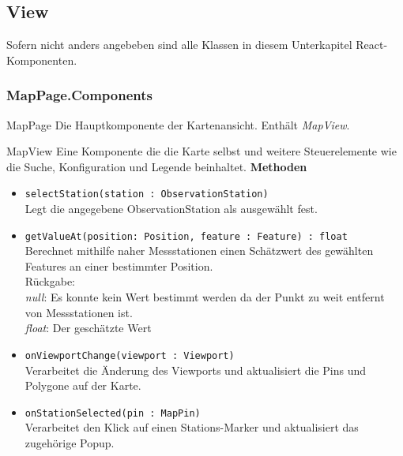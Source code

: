 \subsection{View}
Sofern nicht anders angebeben sind alle Klassen in diesem Unterkapitel React-Komponenten.
\subsubsection{MapPage.Components}
    \begin{Class}{MapPage}
        Die Hauptkomponente der Kartenansicht. Enthält \emph{MapView}.
    \end{Class}
    \begin{Class}{MapView}
        Eine Komponente die die Karte selbst und weitere Steuerelemente wie die Suche, Konfiguration und Legende beinhaltet.
        \textbf{Methoden}
        \begin{itemize}
            \item \texttt{selectStation(station : ObservationStation)}
            \\ Legt die angegebene ObservationStation als ausgewählt fest.
            \item \texttt{getValueAt(position: Position, feature : Feature) : float}
            \\ Berechnet mithilfe naher Messstationen einen Schätzwert des gewählten Features an einer bestimmter Position.
            \\ Rückgabe:
            \\ \emph{null}: Es konnte kein Wert bestimmt werden da der Punkt zu weit entfernt von Messstationen ist.
            \\ \emph{float}: Der geschätzte Wert
            \item \texttt{onViewportChange(viewport : Viewport)}
            \\ Verarbeitet die Änderung des Viewports und aktualisiert die Pins und Polygone auf der Karte.
            \item \texttt{onStationSelected(pin : MapPin)}
            \\ Verarbeitet den Klick auf einen Stations-Marker und aktualisiert das zugehörige Popup.
        \end{itemize}
    \end{Class}

